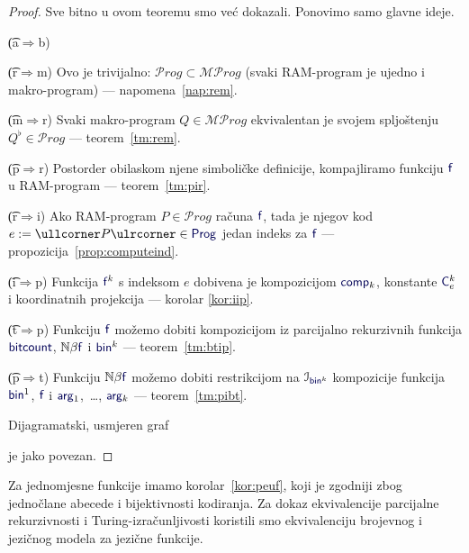 \begin{proof}
Sve bitno u ovom teoremu smo već dokazali. Ponovimo samo glavne ideje.

\begin{labeling}{\t{(a$\Rightarrow$b)}}
    \item[\t{(r$\Rightarrow$m)}] Ovo je trivijalno: $\mathcal Prog\subset\mathcal{MP}rog$ (svaki RAM-program je ujedno i makro-program) --- napomena~\ref{nap:rem}.
    \item[\t{(m$\Rightarrow$r)}] Svaki makro-program $Q\in\mathcal{MP}rog$ ekvivalentan je svojem spljoštenju $Q^\flat\in\mathcal Prog$ --- teorem~\ref{tm:rem}.
    \item[\t{(p$\Rightarrow$r)}] Postorder obilaskom njene simboličke definicije, kompajliramo funkciju $\f f$ u RAM-program --- teorem~\ref{tm:pir}.
    \item[\t{(r$\Rightarrow$i)}] Ako RAM-program $P\in\mathcal Prog$ računa $\f f$, tada je njegov kod $e:=\kprog P\in\f{Prog}$ jedan indeks za $ \f f$ --- propozicija~\ref{prop:computeind}.
    \item[\t{(i$\Rightarrow$p)}] Funkcija $\f f^k$ s indeksom $e$ dobivena je kompozicijom $\f{comp}_k$, konstante $\f C_e^k$ i koordinatnih projekcija --- korolar \ref{kor:iip}.
    \item[\t{(t$\Rightarrow$p)}] Funkciju $\f f$ možemo dobiti kompozicijom iz parcijalno rekurzivnih funkcija $\f{bitcount}$, $\N\beta\f f$ i $\f{bin}^k$ --- teorem~\ref{tm:btip}.
    \item[\t{(p$\Rightarrow$t)}] Funkciju $\N\beta\f f$ možemo dobiti restrikcijom na $\im{\f{bin}^k}$ kompozicije funkcija $\f{bin}^1$, $\f f$ i $\f{arg}_1$,~\ldots, $\f{arg}_k$ --- teorem~\ref{tm:pibt}.
\end{labeling}
Dijagramatski, usmjeren graf
 je jako povezan.
\end{proof}

Za jednomjesne funkcije imamo korolar~\ref{kor:peuf}, koji je zgodniji zbog jednočlane abecede i bijektivnosti kodiranja. Za dokaz ekvivalencije parcijalne rekurzivnosti i Turing-izračunljivosti koristili smo ekvivalenciju brojevnog i jezičnog modela za jezične funkcije.

